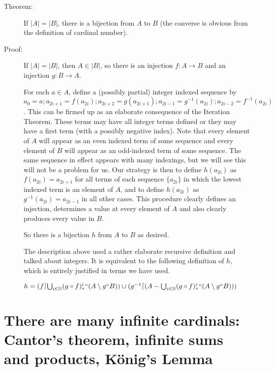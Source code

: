 \documentclass[12pt]{article}
\begin{document}
\begin{description}

\item[Theorem:]  If $|A|=|B|$, there is a bijection from $A$ to $B$ (the converse is obvious from the definition of cardinal number).

\item[Proof:]  If $|A|=|B|$, then $A \in |B|$, so there is an injection $f:A \rightarrow B$ and an injection $g:B \rightarrow A$.  

For each $a \in A$, define a (possibly partial) integer indexed sequence by $a_0 = a; a_{2i+1}= f(a_{2i}); a_{2i+2}= g(a_{2i+1}); a_{2i-1}= g^{-1}(a_{2i}); a_{2i-2}=f^{-1}(a_{2i})$.  This can be firmed up as an elaborate consequence of the Iteration Theorem.  These terms may have all integer terms defined
or they may have a first term (with a possibly negative index).  Note that every element of $A$ will appear as an even indexed term of some sequence and every element of $B$ will appear as an odd-indexed term of some sequence.
The same sequence in effect appears with many indexings, but we will see this will not be a problem for us.  Our strategy is then to define $h(a_{2i})$ as $f(a_{2i})=a_{2i+1}$ for all terms of each sequence $\{a_{2i}\}$ in which the lowest indexed term is an element of $A$, and to define $h(a_{2i})$ as $g^{-1}(a_{2i}) = a_{2i-1}$ in all other cases.
This procedure clearly defines an injection, determines a value at every element of $A$ and also clearly produces every value in $B$.

So there is a bijection $h$ from $A$ to $B$ as desired.

The description above used a rather elaborate recursive definition and talked about integers.  It is equivalent to the following definition of $h$, which is entirely justified in terms we have used.

$h = (f\lceil \bigcup_{i\in \mathbb N}(g \circ f)_*^i``(A \setminus g``B))\cup (g^{-1}\lceil (A-\bigcup_{i\in \mathbb N}(g \circ f)_*^i``(A \setminus g``B)))$



\end{description}

\newpage

\section{There are many infinite cardinals:  Cantor's theorem, infinite sums and products, K\"onig's Lemma}
\end{document}
